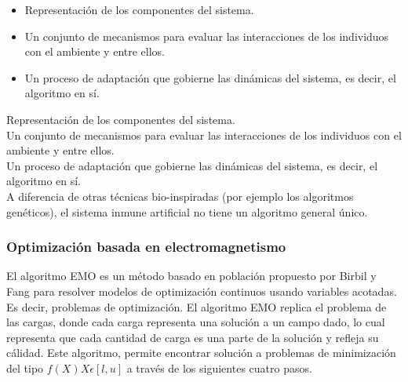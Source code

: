\documentclass{article}
\begin{document}
\begin{itemize}
  \item  Representación de los componentes del sistema.
  \item Un conjunto de mecanismos para evaluar las interacciones de los individuos con el ambiente y entre ellos.
  \item Un proceso de adaptación que gobierne las dinámicas del sistema, es
decir, el algoritmo en sí.
\end{itemize}

 Representación de los componentes del sistema.\\
 Un conjunto de mecanismos para evaluar las interacciones de los individuos con el ambiente y entre ellos.\\
 Un proceso de adaptación que gobierne las dinámicas del sistema, es
decir, el algoritmo en sí.\\

A diferencia de otras técnicas bio-inspiradas (por ejemplo los algoritmos
genéticos), el sistema inmune artificial no tiene un algoritmo general único.












\subsubsection{Optimizaci\'on basada en electromagnetismo}
El algoritmo EMO es un método basado en población propuesto por Birbil y Fang  para resolver modelos de optimización continuos usando variables acotadas. Es decir,  problemas de optimización.
El algoritmo EMO replica el problema de las cargas, donde cada carga representa una solución a un campo dado, lo cual representa que cada cantidad de carga es una parte de la solución y refleja su cálidad. Este algoritmo, permite encontrar solución a problemas de minimización del tipo $f(X) X \epsilon [l,u]$ a través de los siguientes cuatro pasos.
\end{document}

